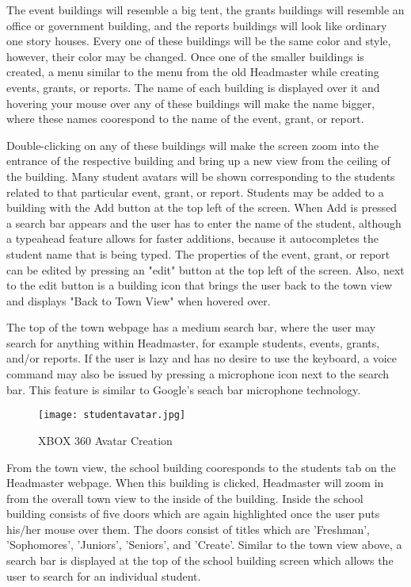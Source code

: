 \documentclass[11pt]{article}
\begin{document}
The event buildings will resemble a big tent, the grants buildings will resemble an office or government building, and the reports buildings will look like ordinary one story houses. Every one of these buildings will be the same color and style, however, their color may be changed. Once one of the smaller buildings is created, a menu similar to the menu from the old Headmaster while creating events, grants, or reports. The name of each building is displayed over it and hovering your mouse over any of these buildings will make the name bigger, where these names coorespond to the name of the event, grant, or report.

Double-clicking on any of these buildings will make the screen zoom into the entrance of the respective building and bring up a new view from the ceiling of the building. Many student avatars \cite{xbox} will be shown corresponding to the students related to that particular event, grant, or report. Students may be added to a building with the Add button at the top left of the screen. When Add is pressed a search bar appears and the user has to enter the name of the student, although a typeahead feature allows for faster additions, because it autocompletes the student name that is being typed. The properties of the event, grant, or report can be edited by pressing an "edit" button at the top left of the screen. Also, next to the edit button is a building icon that brings the user back to the town view and displays "Back to Town View" when hovered over.

 The top of the town webpage has a medium search bar, where the user may search for anything within Headmaster, for example students, events, grants, and/or reports. If the user is lazy and has no desire to use the keyboard, a voice command may also be issued by pressing a microphone icon next to the search bar. This feature is similar to Google's seach bar microphone technology. 

\begin{figure}
\centering
\texttt{[image: studentavatar.jpg]}
\caption{XBOX 360 Avatar Creation}
\label{avatar}
\end{figure}

From the town view, the school building cooresponds to the students tab on the Headmaster webpage. When this building is clicked, Headmaster will zoom in from the overall town view to the inside of the building. Inside the school building consists of five doors which are again highlighted once the user puts his/her mouse over them. The doors consist of titles which are 'Freshman', 'Sophomores', 'Juniors', 'Seniors', and 'Create'. Similar to the town view above, a search bar is displayed at the top of the school building screen which allows the user to search for an individual student.
\end{document}
